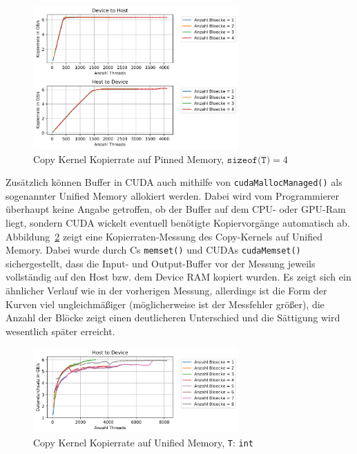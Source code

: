\documentclass[11pt, abstract=on]{scrartcl}
\begin{document}
\begin{figure} [htbp]
 	\centering
 		\includegraphics[width=0.7\textwidth]{Graph_CudaMalloc.png}
 	\caption{Copy Kernel Kopierrate auf Pinned Memory, $\texttt{sizeof(T)} = 4$}
 	\label{fig:CudaMalloc}
\end{figure}

Zusätzlich können Buffer in CUDA auch mithilfe von \texttt{cudaMallocManaged()} als sogenannter Unified Memory allokiert werden. Dabei wird vom Programmierer überhaupt keine Angabe getroffen, ob der Buffer auf dem CPU- oder GPU-Ram liegt, sondern CUDA wickelt eventuell benötigte Kopiervorgänge automatisch ab. Abbildung~\ref{fig:CudaMallocManaged} zeigt eine Kopierraten-Messung des Copy-Kernels auf Unified Memory. Dabei wurde durch Cs \texttt{memset()} und CUDAs \texttt{cudaMemset()} sichergestellt, dass die Input- und Output-Buffer vor der Messung jeweils vollständig auf den Host bzw. dem Device RAM kopiert wurden. Es zeigt sich ein ähnlicher Verlauf wie in der vorherigen Messung, allerdings ist die Form der Kurven viel ungleichmäßiger (möglicherweise ist der Messfehler größer), die Anzahl der Blöcke zeigt einen deutlicheren Unterschied und die Sättigung wird wesentlich später erreicht.

\begin{figure} [htbp]
 	\centering
 		\includegraphics[width=0.7\textwidth]{Graph_CudaMallocManaged.png}
 	\caption{Copy Kernel Kopierrate auf Unified Memory, \texttt{T}: \texttt{int}}
 	\label{fig:CudaMallocManaged}
\end{figure}
\end{document}
